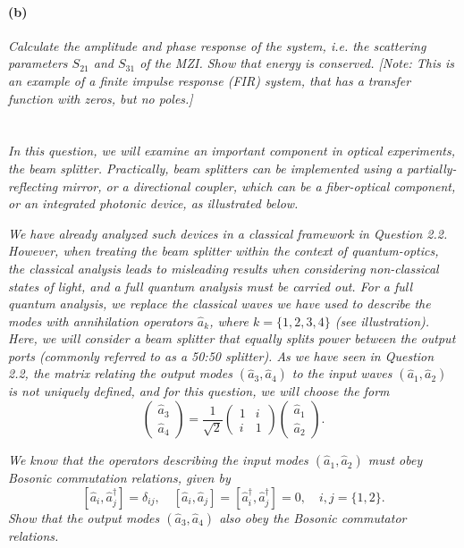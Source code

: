 \documentclass[hyperref, a4paper]{article}
\begin{document}
\paragraph*{(b)} \textit{Calculate the amplitude and phase response of the system, i.e. the scattering parameters $S_{21}$ and $S_{31}$ of the MZI. Show that energy is conserved.
[Note: This is an example of a finite impulse response (FIR) system, that has a transfer function with zeros, but no poles.]} 


\section{}

\textit{In this question, we will examine an important component in optical experiments, the beam splitter. Practically, beam splitters can be implemented using a partially-reflecting mirror, or a directional coupler, which can be a fiber-optical component, or an integrated photonic device, as illustrated below.}

\textit{We have already analyzed such devices in a classical framework in Question 2.2. However, when treating the beam splitter within the context of quantum-optics, the classical analysis leads to misleading results when considering non-classical states of light, and a full quantum analysis must be carried out. For a full quantum analysis, we replace the classical waves we have used to describe the modes with annihilation operators $\hat{a}_k$, where $k=\{1,2,3,4\}$ (see illustration).
Here, we will consider a beam splitter that equally splits power between the output ports (commonly referred to as a 50:50 splitter). As we have seen in Question 2.2, the matrix relating the output modes $\left(\hat{a}_3, \hat{a}_4\right)$ to the input waves $\left(\hat{a}_1, \hat{a}_2\right)$ is not uniquely defined, and for this question, we will choose the form}
$$
\left(\begin{array}{l}
\hat{a}_3 \\
\hat{a}_4
\end{array}\right)=\frac{1}{\sqrt{2}}\left(\begin{array}{ll}
1 & i \\
i & 1
\end{array}\right)\left(\begin{array}{l}
\hat{a}_1 \\
\hat{a}_2
\end{array}\right) .
$$

\textit{We know that the operators describing the input modes $\left(\hat{a}_1, \hat{a}_2\right)$ must obey Bosonic commutation relations, given by
$$
\left[\hat{a}_i, \hat{a}_j^{\dagger}\right]=\delta_{i j}, \quad\left[\hat{a}_i, \hat{a}_j\right]=\left[\hat{a}_i^{\dagger}, \hat{a}_j^{\dagger}\right]=0, \quad i, j=\{1,2\} .
$$
Show that the output modes $\left(\hat{a}_3, \hat{a}_4\right)$ also obey the Bosonic commutator relations.}
\end{document}
